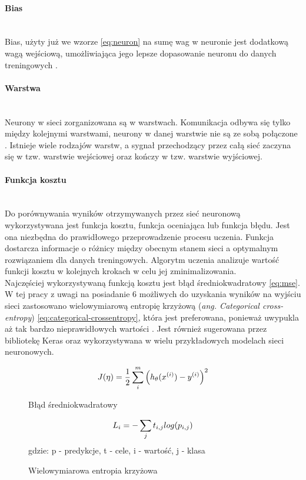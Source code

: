 \paragraph{Bias} \mbox{}\\
Bias, użyty już we wzorze \ref{eq:neuron} na sumę wag w neuronie jest dodatkową wagą wejściową,
umożliwiająca jego lepsze dopasowanie neuronu do danych treningowych \cite{needForBias}.

\paragraph{Warstwa} \mbox{}\\
Neurony w sieci zorganizowana są w warstwach. Komunikacja odbywa się tylko między kolejnymi
warstwami, neurony w danej warstwie nie są ze sobą połączone \cite{CS231n, substBigConv}.
Istnieje wiele rodzajów warstw, a sygnał przechodzący przez całą sieć zaczyna się w tzw.
warstwie wejściowej oraz kończy w tzw. warstwie wyjściowej.

\paragraph{Funkcja kosztu} \mbox{}\\
Do porównywania wyników otrzymywanych przez sieć neuronową wykorzystywana jest funkcja kosztu,
funkcja oceniająca lub funkcja błędu. Jest ona niezbędna do prawidłowego przeprowadzenie
procesu uczenia. Funkcja dostarcza informacje o różnicy między obecnym
stanem sieci a optymalnym rozwiązaniem dla danych treningowych. Algorytm uczenia
analizuje wartość funkcji kosztu w kolejnych krokach w celu jej zminimalizowania.\\
Najczęściej wykorzystywaną funkcją kosztu jest błąd średniokwadratowy \ref{eq:mse}.
W tej pracy z uwagi na posiadanie 6 możliwych do uzyskania wyników na wyjściu sieci
zastosowano wielowymiarową entropię krzyżową (\textit{ang. Categorical cross-entropy}) \ref{eq:categorical-crossentropy},
która jest preferowana, ponieważ uwypukla aż tak bardzo nieprawidłowych wartości \cite{whyNotMSE}. Jest również
sugerowana przez bibliotekę Keras oraz wykorzystywana w wielu przykładowych modelach sieci neuronowych.
\begin{figure}[h!]
\renewcommand{\figurename}{Wzór}%
\begin{equation} \label{eq:mse}
J(\eta) = \frac {1}{2} \sum_{i}^{m} \Big(h_{\theta}(x^{(i)}) - y^{(i)} \Big)^2\\
\end{equation}
\caption{Błąd średniokwadratowy}
\end{figure}
\begin{figure}[h!]
\renewcommand{\figurename}{Wzór}%
\begin{equation} \label{eq:categorical-crossentropy}
L_{i} = - \sum_{j} t_{i,j} log(p_{i,j})\\
\end{equation}
\centering
gdzie: p - predykcje, t - cele, i - wartość, j - klasa
\caption{Wielowymiarowa entropia krzyżowa}
\end{figure}

